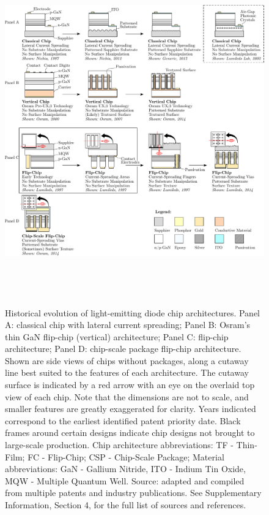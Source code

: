 \documentclass[parskip=full]{article}
\begin{document}
\clearpage
\begin{figure}[h!]
 \centering
 \includegraphics[height=15cm]{figures/chip_architecture_overview.pdf}
 \caption{Historical evolution of light-emitting diode chip architectures. Panel A: classical chip with lateral current spreading; Panel B: Osram’s thin GaN flip-chip (vertical) architecture; Panel C: flip-chip architecture; Panel D: chip-scale package flip-chip architecture. Shown are side views of chips without packages, along a cutaway line best suited to the features of each architecture. The cutaway surface is indicated by a red arrow with an eye on the overlaid top view of each chip. Note that the dimensions are not to scale, and smaller features are greatly exaggerated for clarity. Years indicated correspond to the earliest identified patent priority date. Black frames around certain designs indicate chip designs not brought to large-scale production. Chip architecture abbreviations: TF - Thin-Film; FC - Flip-Chip; CSP - Chip-Scale Package; Material abbreviations: GaN - Gallium Nitride, ITO - Indium Tin Oxide, MQW - Multiple Quantum Well. Source: adapted and compiled from multiple patents and industry publications. See Supplementary Information, Section 4, for the full list of sources and references.}
 \label{fgr:chip_architecture_overview}
\end{figure}
\end{document}
